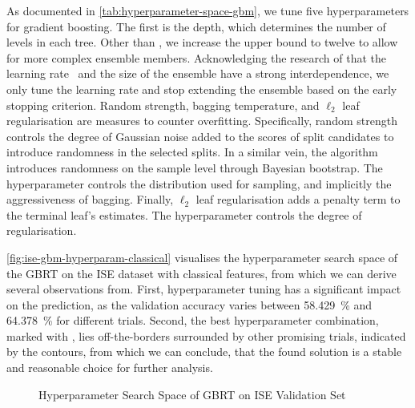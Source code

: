 As documented in \cref{tab:hyperparameter-space-gbm}, we tune five hyperparameters for gradient boosting. The first is the depth, which determines the number of levels in each tree. Other than \textcite[][]{gorishniyRevisitingDeepLearning2021}, we increase the upper bound to twelve to allow for more complex ensemble members. Acknowledging the research of \textcite[][14]{friedmanGreedyFunctionApproximation2001} that the learning rate \eta~and the size of the ensemble have a strong interdependence, we only tune the learning rate and stop extending the ensemble based on the early stopping criterion. Random strength, bagging temperature, and $\ell_2$ leaf regularisation are measures to counter overfitting. Specifically, random strength controls the degree of Gaussian noise added to the scores of split candidates to introduce randomness in the selected splits. In a similar vein, the algorithm introduces randomness on the sample level through Bayesian bootstrap. The hyperparameter controls the distribution used for sampling, and implicitly the aggressiveness of bagging. Finally, $\ell_2$ leaf regularisation adds a penalty term to the terminal leaf's estimates. The hyperparameter controls the degree of regularisation.

\cref{fig:ise-gbm-hyperparam-classical} visualises the hyperparameter search space of the \gls{GBRT} on the \gls{ISE} dataset with classical features, from which we can derive several observations from. First, hyperparameter tuning has a significant impact on the prediction, as the validation accuracy varies between \SI{58.429}{\percent} and \SI{64.378}{\percent} for different trials. Second, the best hyperparameter combination, marked with \bestcircle, lies off-the-borders surrounded by other promising trials, indicated by the contours, from which we can conclude, that the found solution is a stable and reasonable choice for further analysis.

\begin{figure}[!h]
    \vfill
\end{figure}
\clearpage
\begin{figure}[!ht]
    \addtocounter{figure}{-1}
    \caption[]{Hyperparameter Search Space of \gls{GBRT} on \gls{ISE} Validation Set}
    \label{fig:ise-gbm-hyperparam}
\end{figure}

